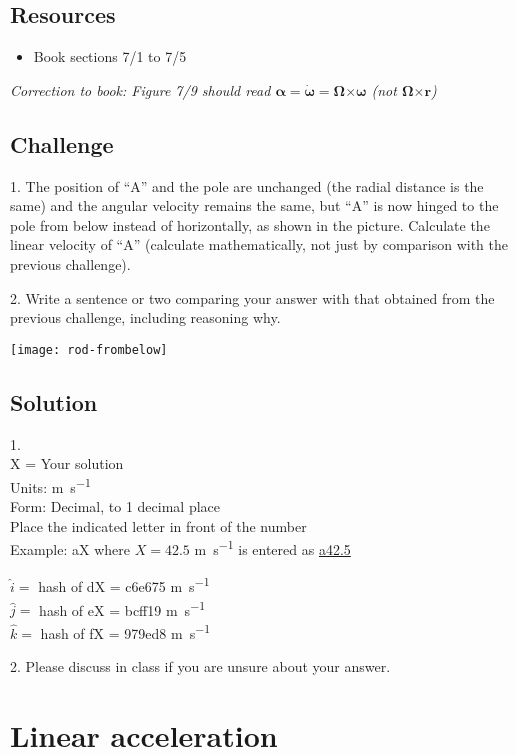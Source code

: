 \subsection*{Resources}
\begin{itemize}
    \item Book sections 7/1 to 7/5
\end{itemize}

\emph{Correction to book: Figure 7/9 should read $\bm{\alpha} = \bm{\dot{\omega}} = \bm{\Omega} \bm{\times} \bm{\omega}$ (not $\bm{\Omega} \bm{\times} \bm{r}$)}

\subsection*{Challenge}
1. The position of ``A'' and the pole are unchanged (the radial distance is the same) and the angular velocity remains the same, but ``A'' is now hinged to the pole from below instead of horizontally, as shown in the picture. Calculate the linear velocity of ``A'' (calculate mathematically, not just by comparison with the previous challenge).

2. Write a sentence or two comparing your answer with that obtained from the previous challenge, including reasoning why.

\texttt{[image: rod-frombelow]}

\subsection*{Solution}
1.\\
X = Your solution\\
Units: \si{\meter\per\second}\\
Form: Decimal, to 1 decimal place\\
Place the indicated letter in front of the number\\
Example: aX where $X=42.5$ \si{\meter\per\second} is entered as \href{http://www.wolframalpha.com/input/?i=md5+hash+of+\%22a42.5\%22}{a42.5}

$\hat{i}=$ hash of dX = c6e675 \si{\meter\per\second}\\
$\hat{j}=$ hash of eX = bcff19 \si{\meter\per\second}\\
$\hat{k}=$ hash of fX = 979ed8 \si{\meter\per\second}

2. Please discuss in class if you are unsure about your answer.




\newpage
\section{Linear acceleration}

